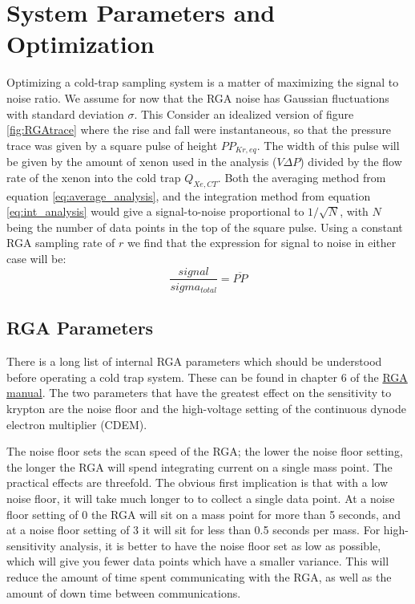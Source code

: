 \documentclass[12pt]{article}
\begin{document}
\section{System Parameters and Optimization}
Optimizing a cold-trap sampling system is a matter of maximizing the signal to noise ratio. We assume for now that the RGA noise has Gaussian fluctuations with standard deviation $\sigma$. This Consider an idealized version of figure \ref{fig:RGAtrace} where the rise and fall were instantaneous, so that the pressure trace was given by a square pulse of height $PP_{Kr,eq}$. The width of this pulse will be given by the amount of xenon used in the analysis ($V\Delta P$) divided by the flow rate of the xenon into the cold trap $Q_{Xe,CT}$. Both the averaging method from equation \ref{eq:average_analysis}, and the integration method from equation \ref{eq:int_analysis} would give a signal-to-noise proportional to $1/\sqrt{N}$, with $N$ being the number of data points in the top of the square pulse. Using a constant RGA sampling rate of $r$ we find that the expression for signal to noise in either case will be:
\begin{equation}
\frac{signal}{sigma_{total}}=\overline{PP}
\end{equation}
 

\subsection{RGA Parameters} 
There is a long list of internal RGA parameters which should be understood before operating a cold trap system. These can be found in chapter 6 of the \href{http://www.thinksrs.com/downloads/PDFs/Manuals/RGAm.pdf}{RGA manual}. The two parameters that have the greatest effect on the sensitivity to krypton are the noise floor and the high-voltage setting of the continuous dynode electron multiplier (CDEM). 

The noise floor sets the scan speed of the RGA; the lower the noise floor setting, the longer the RGA will spend integrating current on a single mass point. The practical effects are threefold. The obvious first implication is that with a low noise floor, it will take much longer to to collect a single data point. At a noise floor setting of 0 the RGA will sit on a mass point for more than 5 seconds, and at a noise floor setting of 3 it will sit for less than 0.5 seconds per mass. For high-sensitivity analysis, it is better to have the noise floor set as low as possible, which will give you fewer data points which have a smaller variance. This will reduce the amount of time spent communicating with the RGA, as well as the amount of down time between communications. 
\end{document}
